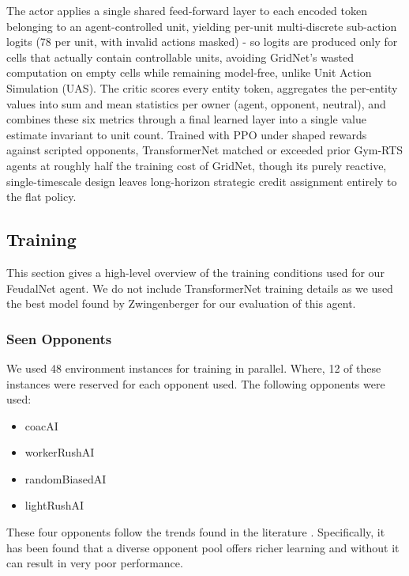 \documentclass[sigconf,review=false]{acmart}
\begin{document}
The actor applies a single shared feed-forward layer to each encoded token belonging to an agent-controlled unit, yielding per-unit multi-discrete sub-action logits (78 per unit, with invalid actions masked) - so logits are produced only for cells that actually contain controllable units, avoiding GridNet's wasted computation on empty cells \cite{micrortsgridnet} while remaining model-free, unlike Unit Action Simulation (UAS). 
The critic scores every entity token, aggregates the per-entity values into sum and mean statistics per owner (agent, opponent, neutral), and combines these six metrics through a final learned layer into a single value estimate invariant to unit count. 
Trained with PPO under shaped rewards against scripted opponents, TransformerNet matched or exceeded prior Gym-\textmu RTS agents at roughly half the training cost of GridNet, though its purely reactive, single-timescale design leaves long-horizon strategic credit assignment entirely to the flat policy.

\subsection{Training}
\label{Training}

This section gives a high-level overview of the training conditions used for our FeudalNet agent.
We do not include TransformerNet training details as we used the best model found by Zwingenberger \cite{transformernet} for our evaluation of this agent.

\subsubsection{Seen Opponents}

We used 48 environment instances for training in parallel.
Where, 12 of these instances were reserved for each opponent used.
The following opponents were used:

\begin{itemize}
    \item coacAI
    \item workerRushAI
    \item randomBiasedAI
    \item lightRushAI
\end{itemize}

These four opponents follow the trends found in the literature \cite{transformernet, micrortsgridnet}.
Specifically, it has been found that a diverse opponent pool offers richer learning \cite{micrortsgridnet} and without it can result in very poor performance.
\end{document}
